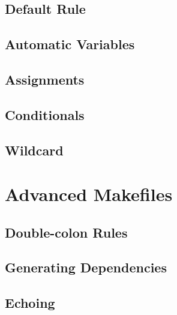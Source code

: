 \documentclass[8pt]{beamer}
\begin{document}
\subsection{Default Rule}


\subsection{Automatic Variables}


\subsection{Assignments}


\subsection{Conditionals}


\subsection{Wildcard}


%
%

\section{Advanced Makefiles}

\subsection{Double-colon Rules}


\subsection{Generating Dependencies}


\subsection{Echoing}
\end{document}

